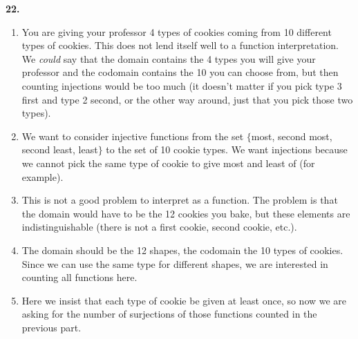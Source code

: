 \documentclass[10pt,]{book}
\theoremstyle{plain}
\theoremstyle{definition}
\theoremstyle{definition}
\theoremstyle{definition}
\numberwithin{equation}{section}
\begin{document}
\par\smallskip
\noindent\textbf{22.}\quad{}
          \leavevmode%
\begin{enumerate}[label=(\alph*)]
\item\hypertarget{li-771}{}
                You are giving your professor 4 types of cookies coming from 10 different types of cookies. This does not lend itself well to a function interpretation. We \emph{could} say that the domain contains the 4 types you will give your professor and the codomain contains the 10 you can choose from, but then counting injections would be too much (it doesn't matter if you pick type 3 first and type 2 second, or the other way around, just that you pick those two types).
\item\hypertarget{li-772}{}
                We want to consider injective functions from the set \(\{\)most, second most, second least, least\(\}\) to the set of 10 cookie types. We want injections because we cannot pick the same type of cookie to give most and least of (for example).
\item\hypertarget{li-773}{}
                This is not a good problem to interpret as a function. The problem is that the domain would have to be the 12 cookies you bake, but these elements are indistinguishable (there is not a first cookie, second cookie, etc.).
\item\hypertarget{li-774}{}
                The domain should be the 12 shapes, the codomain the 10 types of cookies. Since we can use the same type for different shapes, we are interested in counting all functions here.
\item\hypertarget{li-775}{}
                Here we insist that each type of cookie be given at least once, so now we are asking for the number of surjections of those functions counted in the previous part.
\end{enumerate}

\par\smallskip
\typeout{************************************************}
\typeout{************************************************}
\end{document}
